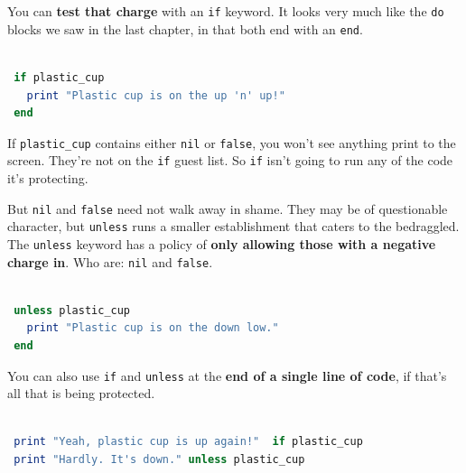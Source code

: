 \documentclass[10pt,twoside]{report}
\begin{document}
You can {\bf test that charge} with an \lstinline[breaklines=true]|if|
keyword.  It looks very much like the \lstinline[breaklines=true]|do|
blocks we saw in the last chapter, in that both end with an
\lstinline[breaklines=true]|end|.


\begin{lstlisting}[basicstyle=\ttfamily\color{basiccolor},
    commentstyle = \ttfamily\color{commentcolor},
    keywordstyle=\ttfamily\color{keywordscolor},
    stringstyle=\color{stringcolor},
    language=Ruby,
    basicstyle=\small\ttfamily,
    showstringspaces=false,
  ]

 if plastic_cup 
   print "Plastic cup is on the up 'n' up!" 
 end

\end{lstlisting}


If \lstinline[breaklines=true]|plastic_cup| contains either
\lstinline[breaklines=true]|nil| or
\lstinline[breaklines=true]|false|, you won't see anything print to
the screen.  They're not on the \lstinline[breaklines=true]|if| guest
list.  So \lstinline[breaklines=true]|if| isn't going to run any of
the code it's protecting.

But \lstinline[breaklines=true]|nil| and
\lstinline[breaklines=true]|false| need not walk away in shame.  They
may be of questionable character, but
\lstinline[breaklines=true]|unless| runs a smaller establishment that
caters to the bedraggled. The \lstinline[breaklines=true]|unless|
keyword has a policy of {\bf only allowing those with a negative
  charge in}. Who are: \lstinline[breaklines=true]|nil| and
\lstinline[breaklines=true]|false|.


\begin{lstlisting}[basicstyle=\ttfamily\color{basiccolor},
    commentstyle = \ttfamily\color{commentcolor},
    keywordstyle=\ttfamily\color{keywordscolor},
    stringstyle=\color{stringcolor},
    language=Ruby,
    basicstyle=\small\ttfamily,
    showstringspaces=false,
  ]

 unless plastic_cup 
   print "Plastic cup is on the down low."  
 end

\end{lstlisting}


You can also use \lstinline[breaklines=true]|if| and
\lstinline[breaklines=true]|unless| at the {\bf end of a single line
  of code}, if that's all that is being protected.


\begin{lstlisting}[basicstyle=\ttfamily\color{basiccolor},
    commentstyle = \ttfamily\color{commentcolor},
    keywordstyle=\ttfamily\color{keywordscolor},
    stringstyle=\color{stringcolor},
    language=Ruby,
    basicstyle=\small\ttfamily,
    showstringspaces=false,
  ]

 print "Yeah, plastic cup is up again!"  if plastic_cup 
 print "Hardly. It's down." unless plastic_cup

\end{lstlisting}
\end{document}
